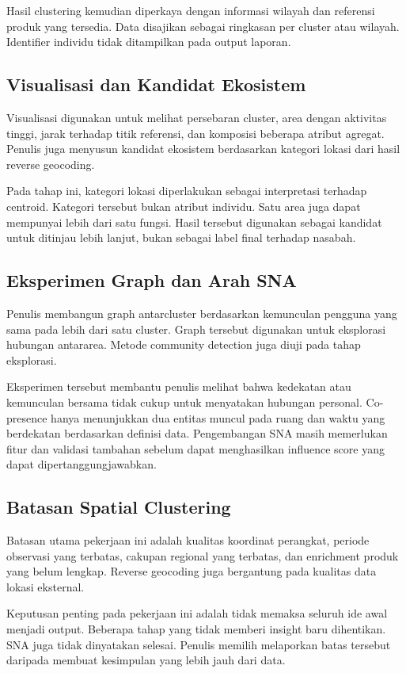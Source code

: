 Hasil clustering kemudian diperkaya dengan informasi wilayah dan referensi produk yang tersedia. Data disajikan sebagai ringkasan per cluster atau wilayah. Identifier individu tidak ditampilkan pada output laporan.

\subsection{Visualisasi dan Kandidat Ekosistem}
Visualisasi digunakan untuk melihat persebaran cluster, area dengan aktivitas tinggi, jarak terhadap titik referensi, dan komposisi beberapa atribut agregat. Penulis juga menyusun kandidat ekosistem berdasarkan kategori lokasi dari hasil reverse geocoding.

Pada tahap ini, kategori lokasi diperlakukan sebagai interpretasi terhadap centroid. Kategori tersebut bukan atribut individu. Satu area juga dapat mempunyai lebih dari satu fungsi. Hasil tersebut digunakan sebagai kandidat untuk ditinjau lebih lanjut, bukan sebagai label final terhadap nasabah.

\subsection{Eksperimen Graph dan Arah SNA}
Penulis membangun graph antarcluster berdasarkan kemunculan pengguna yang sama pada lebih dari satu cluster. Graph tersebut digunakan untuk eksplorasi hubungan antararea. Metode community detection juga diuji pada tahap eksplorasi.

Eksperimen tersebut membantu penulis melihat bahwa kedekatan atau kemunculan bersama tidak cukup untuk menyatakan hubungan personal. Co-presence hanya menunjukkan dua entitas muncul pada ruang dan waktu yang berdekatan berdasarkan definisi data. Pengembangan SNA masih memerlukan fitur dan validasi tambahan sebelum dapat menghasilkan influence score yang dapat dipertanggungjawabkan.

\subsection{Batasan Spatial Clustering}
Batasan utama pekerjaan ini adalah kualitas koordinat perangkat, periode observasi yang terbatas, cakupan regional yang terbatas, dan enrichment produk yang belum lengkap. Reverse geocoding juga bergantung pada kualitas data lokasi eksternal.

Keputusan penting pada pekerjaan ini adalah tidak memaksa seluruh ide awal menjadi output. Beberapa tahap yang tidak memberi insight baru dihentikan. SNA juga tidak dinyatakan selesai. Penulis memilih melaporkan batas tersebut daripada membuat kesimpulan yang lebih jauh dari data.

